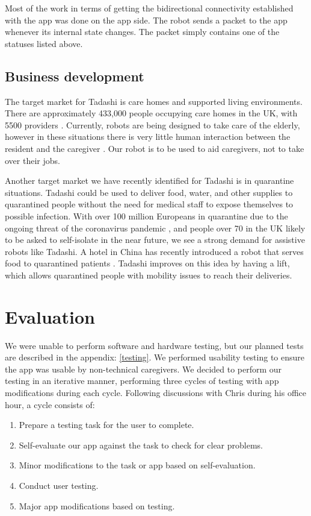 \documentclass{article}
\begin{document}
Most of the work in terms of getting the bidirectional connectivity established with the app was done on the app side. The robot sends a packet to the app whenever its internal state changes. The packet simply contains one of the statuses listed above.

\subsection{Business development}
The target market for Tadashi is care homes and supported living environments. There are approximately 433,000 people occupying care homes in the UK, with 5500 providers \cite{carehomes}. Currently, robots are being designed to take care of the elderly, however in these situations there is very little human interaction between the resident and the caregiver \cite{robotcarers}. Our robot is to be used to aid caregivers, not to take over their jobs.

Another target market we have recently identified for Tadashi is in quarantine situations. Tadashi could be used to deliver food, water, and other supplies to quarantined people without the need for medical staff to expose themselves to possible infection. With over 100 million Europeans in quarantine due to the ongoing threat of the coronavirus pandemic \cite{quarantine}, and people over 70 in the UK likely to be asked to self-isolate \cite{isolate} in the near future, we see a strong demand for assistive robots like Tadashi. A hotel in China has recently introduced a robot that serves food to quarantined patients \cite{peanut}. Tadashi improves on this idea by having a lift, which allows quarantined people with mobility issues to reach their deliveries.

\section{Evaluation}
We were unable to perform software and hardware testing, but our planned tests are described in the appendix: \ref{testing}. 
We performed usability testing to ensure the app was usable by non-technical caregivers. We decided to perform our testing in an iterative manner, performing three cycles of testing with app modifications during each cycle. Following discussions with Chris during his office hour, a cycle consists of:
\begin{enumerate}
  \item Prepare a testing task for the user to complete.
  \item Self-evaluate our app against the task to check for clear problems.
  \item Minor modifications to the task or app based on self-evaluation.
  \item Conduct user testing.
  \item Major app modifications based on testing.
\end{enumerate}
\end{document}
